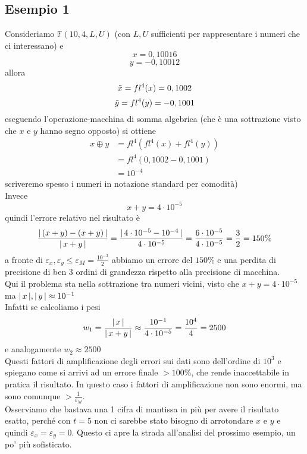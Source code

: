 \subsection{Esempio 1}
Consideriamo $\mathbb{F}(10,4,L,U)$ (con $L,U$ sufficienti per rappresentare i numeri che ci interessano) e \[x = 0,10016\]  \[y = -0,10012\]
allora \[\Tilde{x} = fl^4(x) = 0,1002\]  \[\Tilde{y} = fl^4(y) = -0,1001\]
eseguendo l'operazione-macchina di somma algebrica (che è una sottrazione visto che $x$ e $y$ hanno segno opposto) si ottiene
\[\begin{split}
    x \oplus y & = fl^4(fl^4(x) + fl^4(y)) \\
    & = fl^4(0,1002 -0,1001) \\
    & = 10^{-4}
\end{split}\]
scriveremo spesso i numeri in notazione standard per comodità) \\
Invece \[x+y=4 \cdot 10^{-5}\] quindi l'errore relativo nel risultato è
\[ \frac{\lvert\,(x+y)-(x+y)\,\rvert}{\lvert\,x+y\,\rvert} = \frac{\lvert\,4 \cdot 10^{-5} - 10^{-4}\,\rvert}{4 \cdot10^{-5}} = \frac{6 \cdot 10^{-5}}{4 \cdot 10^{-5}} = \frac{3}{2} = 150\%\]
a fronte di $\varepsilon_x, \varepsilon_y \le \varepsilon_M = \frac{10^{-3}}{2}$ abbiamo un errore del $150\%$ e una perdita di precisione di ben 3 ordini di grandezza rispetto alla precisione di macchina.\\
Qui il problema sta nella sottrazione tra numeri vicini, visto che $x+y=4 \cdot 10^{-5}$ ma $\lvert\,x\,\rvert,\lvert\,y\,\rvert \approx 10^{-1}$\\
Infatti se calcoliamo i pesi 
\[ w_1 = \frac{\lvert\,x\,\rvert}{\lvert\,x+y\,\rvert} \approx \frac{10^{-1}}{4 \cdot 10^{-5}} = \frac{10^4}{4} = 2500\] e analogamente $w_2 \approx 2500$\\
Questi fattori di amplificazione degli errori sui dati sono dell'ordine di $10^3$ e spiegano come si arrivi ad un errore finale $>100\%$, che rende inaccettabile in pratica il risultato. In questo caso i fattori di amplificazione non sono enormi, ma sono comunque $> \frac{1}{\varepsilon_M}$. \\
Osserviamo che bastava una 1 cifra di mantissa in più per avere il risultato esatto, perché con $t=5$ non ci sarebbe stato bisogno di arrotondare $x$ e $y$ e quindi $\varepsilon_x = \varepsilon_y = 0$. 
\newline \newline
Questo ci apre la strada all'analisi del prossimo esempio, un po' più sofisticato.

